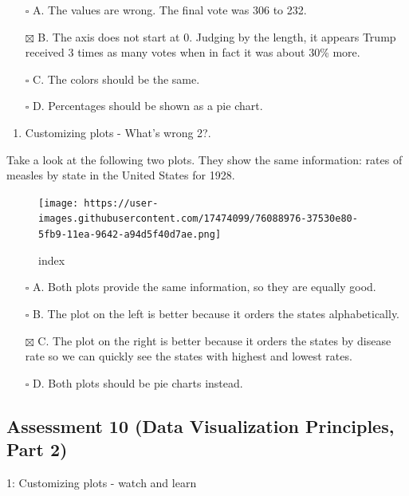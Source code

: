 \documentclass[
]{article}
\providecommand{\tightlist}{%
  \setlength{\itemsep}{0pt}\setlength{\parskip}{0pt}}
\begin{document}
\begin{itemize}
\tightlist
\item[$\square$]
  A. The values are wrong. The final vote was 306 to 232.
\item[$\boxtimes$]
  B. The axis does not start at 0. Judging by the length, it appears
  Trump received 3 times as many votes when in fact it was about 30\%
  more.
\item[$\square$]
  C. The colors should be the same.
\item[$\square$]
  D. Percentages should be shown as a pie chart.
\end{itemize}

\begin{enumerate}
\def\labelenumi{\arabic{enumi}.}
\setcounter{enumi}{2}
\tightlist
\item
  Customizing plots - What's wrong 2?.
\end{enumerate}

Take a look at the following two plots. They show the same information:
rates of measles by state in the United States for 1928.

\begin{figure}
\centering
\texttt{[image: https://user-images.githubusercontent.com/17474099/76088976-37530e80-5fb9-11ea-9642-a94d5f40d7ae.png]}
\caption{index}
\end{figure}

\begin{itemize}
\tightlist
\item[$\square$]
  A. Both plots provide the same information, so they are equally good.
\item[$\square$]
  B. The plot on the left is better because it orders the states
  alphabetically.
\item[$\boxtimes$]
  C. The plot on the right is better because it orders the states by
  disease rate so we can quickly see the states with highest and lowest
  rates.
\item[$\square$]
  D. Both plots should be pie charts instead.
\end{itemize}

\hypertarget{assessment-10-data-visualization-principles-part-2}{%
\subsection{Assessment 10 (Data Visualization Principles, Part
2)}\label{assessment-10-data-visualization-principles-part-2}}

1: Customizing plots - watch and learn
\end{document}
